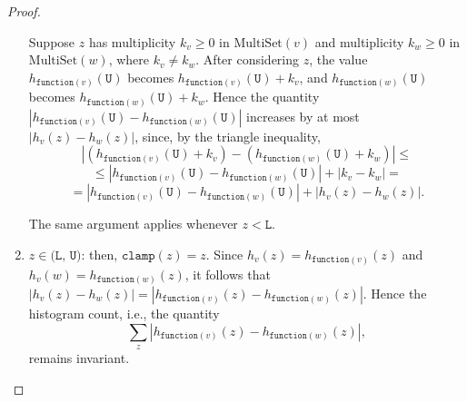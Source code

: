 \documentclass[11pt,a4paper]{article}
\theoremstyle{definition}
\newcommand{\MultiSet}{\mathrm{MultiSet}}
\newcommand{\clamp}{\texttt{clamp}}
\newcommand{\function}{\texttt{function}}
\newcommand{\silvia}[1]{{ {\color{blue}{(silvia)~#1}}}}
\newcommand{\grace}[1]{{ {\color{purple}{(grace)~#1}}}}
\begin{document}
\begin{proof}
\begin{enumerate}
    
    Suppose $z$ has multiplicity $k_v \geq 0$ in $\MultiSet(v)$ and multiplicity $k_w \geq 0$ in $\MultiSet(w)$, where $k_v \neq k_w$. After considering $z$, the value $h_{\function(v)}(\texttt{U})$ becomes $h_{\function(v)}(\texttt{U}) + k_v$, and $h_{\function(w)}(\texttt{U})$ becomes $h_{\function(w)}(\texttt{U}) + k_w$. Hence the quantity $|h_{\function(v)}(\texttt{U}) - h_{\function(w)}(\texttt{U})|$ increases by at most $|h_v(z) - h_w(z)|$, since, by the triangle inequality,
    \[
         |(h_{\function(v)}(\texttt{U}) + k_v) - (h_{\function(w)}(\texttt{U}) + k_w)| \leq
    \]
    \[
         \leq |h_{\function(v)}(\texttt{U}) - h_{\function(w)}(\texttt{U})| + |k_v - k_w| =
    \]
    \[
        = |h_{\function(v)}(\texttt{U}) - h_{\function(w)}(\texttt{U})| + |h_v(z) - h_w(z)|.
    \]
    
    
    
    The same argument applies whenever $z < \texttt{L}$. 
    
    \silvia{The first subcase discussed here, i.e., when $k_v = k_w$, is also proven by the triangle inequality expression above, but it seemed clean to separate the case where the total sum remains invariant.}
    
    \item $z \in \texttt{(L, U)}$: then, $\clamp(z) = z$. Since $h_v(z) = h_{\function(v)}(z)$ and $h_v(w) = h_{\function(w)}(z)$, it follows that $|h_v(z) - h_w(z)| = |h_{\function(v)}(z) - h_{\function(w)}(z)|$. Hence the histogram count, i.e., the quantity
     \[
        \sum_z |h_{\function(v)}(z) - h_{\function(w)}(z)|,
    \]
    remains invariant.
    
    

\end{enumerate}
\end{proof}
\end{document}

